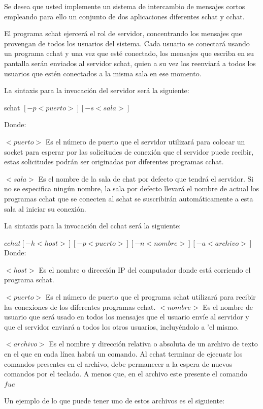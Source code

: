 \documentclass[11pt, spanish]{extarticle}
\begin{document}
Se desea que usted implemente un sistema de intercambio de mensajes cortos empleando 
para ello un conjunto de dos aplicaciones diferentes schat y cchat.

El programa schat ejercerá el rol de servidor, concentrando los mensajes que provengan de 
todos los usuarios del sistema. Cada usuario se conectará usando un programa cchat y una 
vez que esté conectado, los mensajes que escriba en su pantalla serán enviados al servidor 
schat, quien a su vez los reenviará a todos los usuarios que estén conectados a la misma sala 
en ese momento.

La sintaxis para la invocación del servidor será la siguiente: 

schat $[-p <puerto>] [-s <sala>] $

Donde: 

$<puerto>$ Es el número de puerto que el servidor utilizará para colocar un socket para 
esperar por las solicitudes de conexión que el servidor puede recibir, estas solicitudes 
podrán ser originadas por diferentes programas cchat. 

$<sala>$ Es el nombre de la sala de chat por defecto que tendrá el servidor. Si no se 
especifica ningún nombre, la sala por defecto llevará el nombre de actual los programas 
cchat que se conecten al schat se suscribirán automáticamente a esta sala al iniciar su 
conexión. 

La sintaxis para la invocación del cchat será la siguiente: 

$cchat [-h <host>] [-p <puerto>] [-n <nombre>][-a <archivo>] $
Donde: 

$<host>$ Es el nombre o dirección IP del computador donde está corriendo el programa 
schat. 

$<puerto>$ Es el número de puerto que el programa schat utilizará para recibir las 
conexiones de los diferentes programas cchat. $<nombre>$ Es el nombre de usuario que será usado en todos los mensajes que el usuario envíe al servidor y que el servidor enviará a todos los otros usuarios, incluyéndolo a 'el mismo. 

$<archivo>$ Es el nombre y dirección relativa o absoluta de un archivo de texto en el que 
en cada línea habrá un comando. Al cchat terminar de ejecuatr los comandos 
presentes en el archivo, debe permanecer a la espera de nuevos comandos por el teclado. A 
menos que, en el archivo este presente el comando $fue$
 
Un ejemplo de lo que puede tener uno de estos archivos es el siguiente: 
\end{document}
